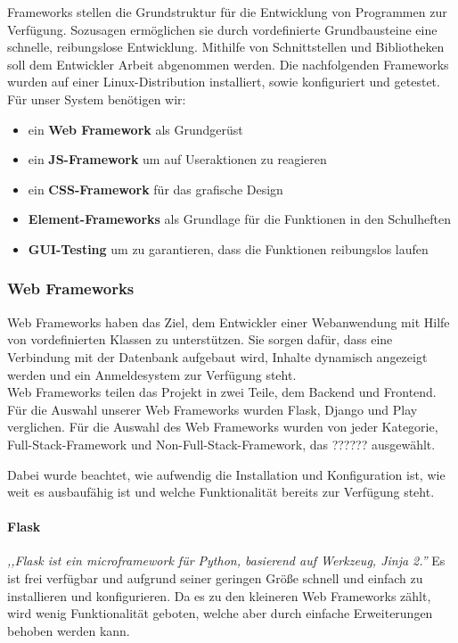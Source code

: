
Frameworks stellen die Grundstruktur für die Entwicklung von Programmen zur Verfügung. Sozusagen ermöglichen sie durch vordefinierte Grundbausteine eine schnelle, reibungslose Entwicklung. Mithilfe von Schnittstellen und Bibliotheken soll dem Entwickler Arbeit abgenommen werden. Die nachfolgenden Frameworks wurden auf einer Linux-Distribution installiert, sowie konfiguriert und getestet.\\
Für unser System benötigen wir:
\begin{itemize}
\item ein \textbf{Web Framework} als Grundgerüst
\item ein \textbf{JS-Framework} um auf Useraktionen zu reagieren
\item ein \textbf{\gls{CSS}-Framework} für das grafische Design
\item \textbf{Element-Frameworks} als Grundlage für die Funktionen in den Schulheften
\item \textbf{GUI-Testing} um zu garantieren, dass die Funktionen reibungslos laufen
\end{itemize}

\subsubsection{Web Frameworks}
Web Frameworks haben das Ziel, dem Entwickler einer Webanwendung mit Hilfe von vordefinierten Klassen zu unterstützen. Sie sorgen dafür, dass eine Verbindung mit der Datenbank aufgebaut wird, Inhalte dynamisch angezeigt werden und ein Anmeldesystem zur Verfügung steht.\\
Web Frameworks teilen das Projekt in zwei Teile, dem Backend und Frontend.\\
Für die Auswahl unserer Web Frameworks wurden Flask, Django und Play verglichen. Für die Auswahl des Web Frameworks wurden von jeder Kategorie, Full-Stack-Framework und Non-Full-Stack-Framework, das ?????? ausgewählt.

Dabei wurde beachtet, wie aufwendig die Installation und Konfiguration ist, wie weit es ausbaufähig ist und welche Funktionalität bereits zur Verfügung steht.

\newpage

\paragraph{Flask}
\textit{,,Flask ist ein microframework für Python, basierend auf Werkzeug, Jinja 2.''}\cite{FLASK} Es ist frei verfügbar und aufgrund seiner geringen Größe schnell und einfach zu installieren und konfigurieren. Da es zu den kleineren Web Frameworks zählt, wird wenig Funktionalität geboten, welche aber durch einfache Erweiterungen behoben werden kann.\cite{FLASK}

